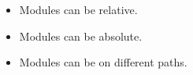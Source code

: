 \begin{slide}
    \begin{itemize}
        \item Modules can be relative.
        \item Modules can be absolute.
        \item Modules can be on different paths.
    \end{itemize}
\end{slide}

